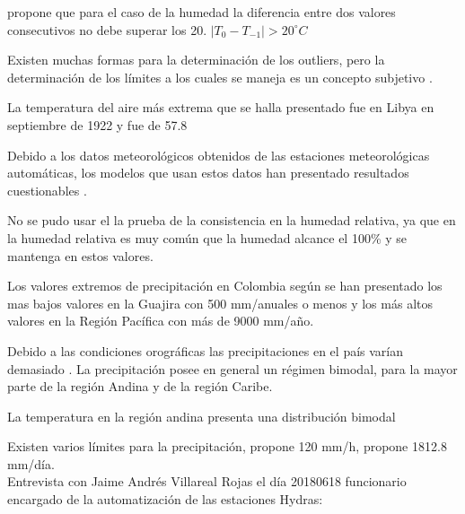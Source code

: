 \citep{Graybeal2004b} propone que para el caso de la humedad la diferencia entre dos valores consecutivos no debe superar los 20\celc. $|T_0 - T_{-1}| > 20^{\circ}C$
 
Existen muchas formas para la determinación de los outliers, pero la determinación de los límites a los cuales se maneja es un concepto subjetivo \citet{Graybeal2004b}.

La temperatura del aire más extrema que se halla presentado fue en Libya en septiembre de 1922 y fue de 57.8\celc \citep{Kubecka2001}

Debido a los datos meteorológicos obtenidos de las estaciones meteorológicas automáticas, los modelos que usan estos datos han presentado resultados cuestionables \citep{Meek1994}.

No se pudo usar el la prueba de la consistencia en la humedad relativa, ya que en la humedad relativa es muy común que la humedad alcance el 100\% y se mantenga en estos valores.

Los valores extremos de precipitación en Colombia según \citet{Arango2014} se han presentado los mas bajos valores en la Guajira con 500 mm/anuales o menos y los más altos valores en la Región Pacífica con más de 9000 mm/año.

Debido a las condiciones orográficas las precipitaciones en el país varían demasiado \citep{Arango2014}. La precipitación posee en general un régimen bimodal, para la mayor parte de la región Andina y de la región Caribe.

La temperatura en la región andina presenta una distribución bimodal

Existen varios límites para la precipitación, \citet{Estevez2011} propone 120 mm/h, \citet{Feng2004} propone 1812.8 mm/día.\\

Entrevista con Jaime Andrés Villareal Rojas el día 20180618 funcionario encargado de la automatización de las estaciones Hydras:

